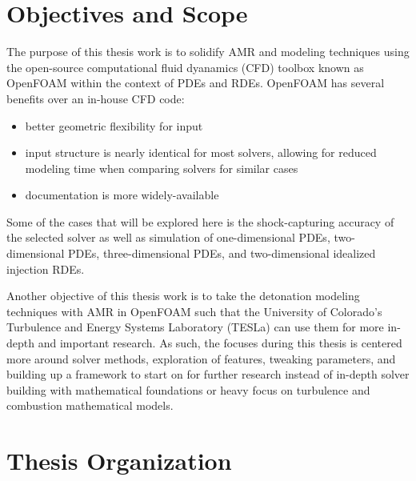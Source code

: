\section{Objectives and Scope}
The purpose of this thesis work is to solidify AMR and modeling techniques using the open-source computational fluid dyanamics (CFD) toolbox known as OpenFOAM within the context of PDEs and RDEs. OpenFOAM has several benefits over an in-house CFD code:

\begin{itemize}
    \item better geometric flexibility for input 
    \item input structure is nearly identical for most solvers, allowing for reduced modeling time when comparing solvers for similar cases
    \item documentation is more widely-available
\end{itemize}

\noindent Some of the cases that will be explored here is the shock-capturing accuracy of the selected solver as well as simulation of one-dimensional PDEs, two-dimensional PDEs, three-dimensional PDEs, and two-dimensional idealized injection RDEs.

Another objective of this thesis work is to take the detonation modeling techniques with AMR in OpenFOAM such that the University of Colorado's Turbulence and Energy Systems Laboratory (TESLa) can use them for more in-depth and important research. As such, the focuses during this thesis is centered more around solver methods, exploration of features, tweaking parameters, and building up a framework to start on for further research instead of in-depth solver building with mathematical foundations or heavy focus on turbulence and combustion mathematical models. 

\section{Thesis Organization}
